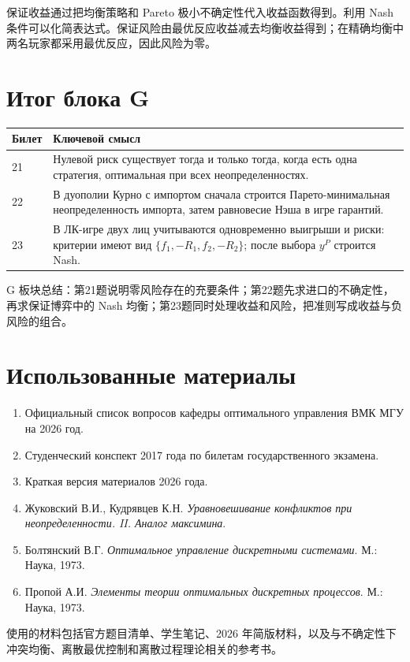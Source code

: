 \documentclass[12pt,a4paper]{article}
\newcommand{\zh}[1]{\par\noindent #1\par}
\begin{document}
\zh{保证收益通过把均衡策略和 Pareto 极小不确定性代入收益函数得到。利用 Nash 条件可以化简表达式。保证风险由最优反应收益减去均衡收益得到；在精确均衡中两名玩家都采用最优反应，因此风险为零。}

\newpage
\section*{Итог блока G}
\begin{tabular}{p{}p{}}
\toprule
Билет & Ключевой смысл \\
\midrule
21 & Нулевой риск существует тогда и только тогда, когда есть одна стратегия, оптимальная при всех неопределенностях. \\
22 & В дуополии Курно с импортом сначала строится Парето-минимальная неопределенность импорта, затем равновесие Нэша в игре гарантий. \\
23 & В ЛК-игре двух лиц учитываются одновременно выигрыши и риски: критерии имеют вид $\{f_1,-R_1,f_2,-R_2\}$; после выбора $y^P$ строится Nash. \\
\bottomrule
\end{tabular}

\zh{G 板块总结：第21题说明零风险存在的充要条件；第22题先求进口的不确定性，再求保证博弈中的 Nash 均衡；第23题同时处理收益和风险，把准则写成收益与负风险的组合。}

\section*{Использованные материалы}
\begin{enumerate}
  \item Официальный список вопросов кафедры оптимального управления ВМК МГУ на 2026 год.
  \item Студенческий конспект 2017 года по билетам государственного экзамена.
  \item Краткая версия материалов 2026 года.
  \item Жуковский В.И., Кудрявцев К.Н. \textit{Уравновешивание конфликтов при неопределенности. II. Аналог максимина}.
  \item Болтянский В.Г. \textit{Оптимальное управление дискретными системами}. М.: Наука, 1973.
  \item Пропой А.И. \textit{Элементы теории оптимальных дискретных процессов}. М.: Наука, 1973.
\end{enumerate}

\zh{使用的材料包括官方题目清单、学生笔记、2026 年简版材料，以及与不确定性下冲突均衡、离散最优控制和离散过程理论相关的参考书。}
\end{document}
